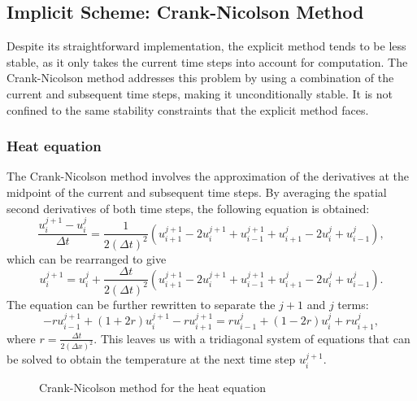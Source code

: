 \subsection{Implicit Scheme: Crank-Nicolson Method}
Despite its straightforward implementation, the explicit method tends to be less stable, as it only takes the current time steps into account for computation. The Crank-Nicolson method addresses this problem by using a combination of the current and subsequent time steps, making it unconditionally stable. It is not confined to the same stability constraints that the explicit method faces.

\subsubsection{Heat equation}
The Crank-Nicolson method involves the approximation of the derivatives at the midpoint of the current and subsequent time steps. By averaging the spatial
second derivatives of both time steps, the following equation is obtained:
\begin{equation}
    \frac{u_i^{j+1} - u_i^j}{\Delta t} = \frac{1}{2(\Delta t)^2} (u_{i+1}^{j+1} - 2u_i^{j+1} + u_{i-1}^{j+1} + u_{i+1}^j - 2u_i^j + u_{i-1}^j),
\end{equation}
which can be rearranged to give
\begin{equation}
    u_i^{j+1} = u_i^j + \frac{\Delta t}{2(\Delta t)^2} (u_{i+1}^{j+1} - 2u_i^{j+1} + u_{i-1}^{j+1} + u_{i+1}^j - 2u_i^j + u_{i-1}^j).
\end{equation}
The equation can be further rewritten to separate the $j+1$ and $j$ terms:
\begin{equation}
    -r u_{i-1}^{j+1} + (1 + 2r) u_i^{j+1} - r u_{i+1}^{j+1} = r u_{i-1}^j + (1 - 2r) u_i^j + r u_{i+1}^j,
\end{equation}
where $r = \frac{\Delta t}{2(\Delta x)^2}$. This leaves us with a tridiagonal system of equations that can be solved to obtain the temperature at the next time step $u_i^{j+1}$.

\begin{figure}[H]
    \centering
    \caption{Crank-Nicolson method for the heat equation}
    \label{fig:heat-cn}
\end{figure}

